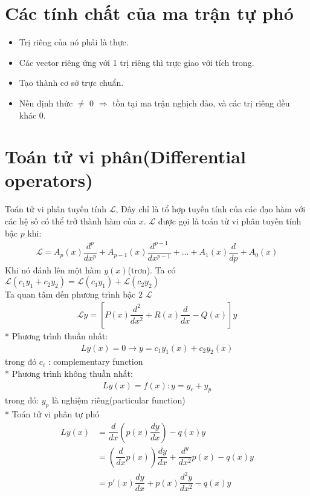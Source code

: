 \documentclass{report}
\begin{document}
\section{Các tính chất của ma trận tự phó}
\begin{itemize}
	\item Trị riêng của nó phải là thực.
	\item Các vector riêng ứng với 1 trị riêng thì trực giao với tích trong.
	\item Tạo thành cơ sở trực chuẩn.
	\item Nến định thức $\neq$ 0 $\Rightarrow$ tồn tại ma trận nghịch đảo, và các trị riêng đều khác 0.
\end{itemize}
\section{Toán tử vi phân(Differential operators)}
Toán tử vi phân tuyến tính $\mathcal{L}$, Đây chỉ là tổ hợp tuyến tính của các đạo hàm với các hệ số có thể trở thành hàm của $x$. $\mathcal{L}$ được gọi là toán tử vi phân tuyến tính bậc $p$ khi:
\begin{align*}
	\mathcal{L} = A_p(x)\dfrac{d^p}{dx^p} + A_{p-1}(x)\dfrac{d^{p-1}}{dx^{p-1}} +...+A_1(x)\dfrac{d}{dp} + A_0(x)
\end{align*}
Khi nó đánh lên một hàm $y(x)$(trơn). Ta có $\mathcal{L}(c_1y_1+c_2y_2)=\mathcal{L}(c_1y_1)+\mathcal{L}(c_2y_2) $\\
Ta quan tâm đến phương trình bậc 2 $\mathcal{L}$
\begin{align}
	\mathcal{L}y = \left[ P(x)\dfrac{d^2}{dx^2}+ R(x)\dfrac{d}{dx} - Q(x) \right] y
\end{align}
* Phương trình thuần nhất:
\begin{align*}
	Ly(x) = 0 \rightarrow y = c_1y_1(x) + c_2y_2(x)
\end{align*}
trong đó $c_i$ : complementary function\\
* Phương trình không thuần nhất:
\begin{align*}
	Ly(x)=f(x): y = y_c + y_p
\end{align*}
trong đó: $y_p$ là nghiệm riêng(particular function)\\
* Toán tử vi phân tự phó
\begin{align}
	Ly(x) & = \dfrac{d}{dx}\left(p(x)\dfrac{dy}{dx}\right) - q(x)y\nonumber                       \\
	      & = \left(\dfrac{d}{dx}p(x)\right)\dfrac{dy}{dx} + \dfrac{d^y}{dx^2}p(x)-q(x)y\nonumber \\
	      & = p'(x)\dfrac{dy}{dx} + p(x)\dfrac{d^2y}{dx^2}-q(x)y
\end{align}
\end{document}
